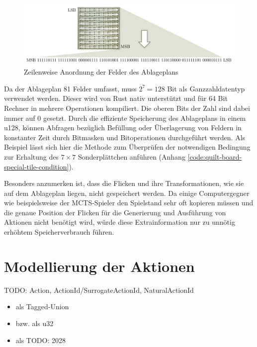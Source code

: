 \begin{figure}[!ht]
    \centering
     \vspace*{-\baselineskip}
    \includegraphics[width=\textwidth]{res/pictures/quilt-board-storage.pdf}
    \caption{Zeilenweise Anordnung der Felder des Ablageplans}
    \label{fig:quilt-board-storage}
\end{figure}

Da der Ablageplan 81 Felder umfasst, muss $2^7=128$ Bit als Ganzzahldatentyp verwendet werden. Dieser wird von Rust nativ unterstützt und für 64 Bit Rechner in mehrere Operationen kompiliert. Die oberen Bits der Zahl sind dabei immer auf 0 gesetzt. Durch die effiziente Speicherung des Ablageplans in einem \ac{u128}, können Abfragen bezüglich Befüllung oder Überlagerung von Feldern in konstanter Zeit durch Bitmasken und Bitoperationen durchgeführt werden. Als Beispiel lässt sich hier die Methode zum Überprüfen der notwendigen Bedingung zur Erhaltung des $7\times 7$ Sonderplättchen anführen (Anhang \ref{code:quilt-board-special-tile-condition}).

Besonders anzumerken ist, dass die Flicken und ihre Transformationen, wie sie auf dem Ablageplan liegen, nicht gespeichert werden. Da einige Computergegner wie beispielsweise der \ac{MCTS}-Spieler den Spielstand sehr oft kopieren müssen und die genaue Position der Flicken für die Generierung und Ausführung von Aktionen nicht benötigt wird, würde diese Extrainformation nur zu unnötig erhöhtem Speicherverbrauch führen.

\section{Modellierung der Aktionen}

TODO: Action, ActionId/SurrogateActionId, NaturalActionId



\begin{itemize}
    \item {} als Tagged-Union
    \item {} bzw.  als \ac{u32}
    \item {} als TODO: 2028
\end{itemize}

